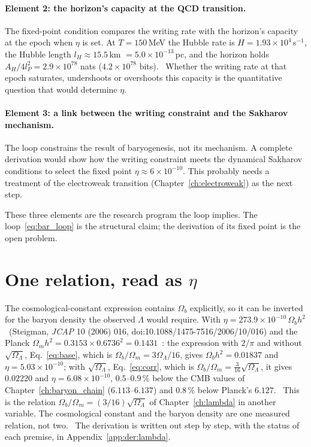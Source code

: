 \paragraph{Element 2: the horizon's capacity at the QCD transition.} The fixed-point condition compares the writing rate with the
horizon's capacity at the epoch when $\eta$ is set. At $T=150$\,MeV the Hubble rate is $H=1.93\times10^4$\,s$^{-1}$, the Hubble length
$l_H\approx15.5$\,km $=5.0\times10^{-13}$\,pc, and the horizon holds $A_H/4l_P^2=2.9\times10^{78}$ nats ($4.2\times10^{78}$ bits).
\calc\ Whether the writing rate at that epoch saturates, undershoots or overshoots this capacity is the quantitative question that
would determine $\eta$. \openprob

\paragraph{Element 3: a link between the writing constraint and the Sakharov mechanism.} The loop constrains the result of baryogenesis,
not its mechanism. A complete derivation would show how the writing constraint meets the dynamical Sakharov conditions to select the
fixed point $\eta\approx6\times10^{-10}$. This probably needs a treatment of the electroweak transition (Chapter~\ref{ch:electroweak}) as the next step. \openprob

These three elements are the research program the loop implies. The loop~\eqref{eq:bar_loop} is the structural claim; the
derivation of its fixed point is the open problem. \openprob

\section{One relation, read as $\eta$}\label{sec:bar_onerel}
The cosmological-constant expression contains $\Omega_b$ explicitly, so it can be inverted for the baryon density the observed
$\Lambda$ would require. With $\eta=273.9\times10^{-10}\,\Omega_bh^2$~(Steigman, \emph{JCAP} 10 (2006) 016, doi:\allowbreak{}10.1088/\allowbreak{}1475-7516/\allowbreak{}2006/\allowbreak{}10/\allowbreak{}016) and the Planck
$\Omega_mh^2=0.3153\times0.6736^2=0.1431$~\cite{Planck2018VI}: the expression with $2/\pi$ and without $\sqrt{\Omega_\Lambda}$,
Eq.~\eqref{eq:base}, which is $\Omega_b/\Omega_m=3\Omega_\Lambda/16$, gives $\Omega_bh^2=0.01837$ and $\eta=5.03\times10^{-10}$; with
$\sqrt{\Omega_\Lambda}$, Eq.~\eqref{eq:corr}, which is $\Omega_b/\Omega_m=\tfrac3{16}\sqrt{\Omega_\Lambda}$, it gives $0.02220$ and
$\eta=6.08\times10^{-10}$, $0.5$--$0.9\,\%$ below the CMB values of Chapter~\ref{ch:baryon_chain} ($6.113$--$6.137$) and $0.8\,\%$ below
Planck's $6.127$. \calc\ This is the relation $\Omega_b/\Omega_m=(3/16)\sqrt{\Omega_\Lambda}$ of Chapter~\ref{ch:lambda} in another
variable. The cosmological constant and the baryon density are one measured relation, not two. \observed\ The derivation is written
out step by step, with the status of each premise, in Appendix~\ref{app:der:lambda}.

